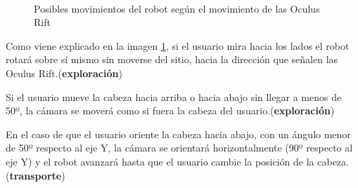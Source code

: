 \documentclass[twoside, 11pt]{epstfg}
\begin{document}
\begin{figure}[H]
	\centering
	\\
	\caption{Posibles movimientos del robot según el movimiento de las Oculus Rift} \label{movRobot}
\end{figure}

Como viene explicado en la imagen \ref{movRobot}, si el usuario mira hacia los lados el robot rotará sobre sí mismo sin moverse del sitio, hacia la dirección que señalen las Oculus Rift.(\textbf{exploración})

Si el usuario mueve la cabeza hacia arriba o hacia abajo sin llegar a menos de 50º, la cámara se moverá como si fuera la cabeza del usuario.(\textbf{exploración})

En el caso de que el usuario oriente la cabeza hacia abajo, con un ángulo menor de 50º respecto al eje Y, la cámara se orientará horizontalmente (90º respecto al eje Y) y el robot avanzará hasta que el usuario cambie la posición de la cabeza.(\textbf{transporte})
\end{document}
